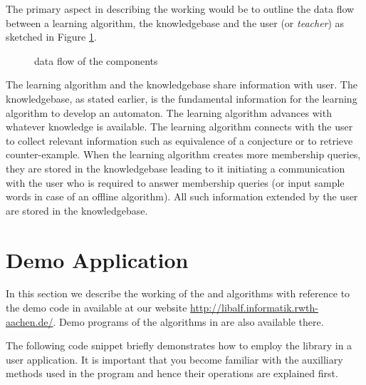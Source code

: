 The primary aspect in describing the working would be to outline the data flow between a learning algorithm, the knowledgebase and the user (or \emph{teacher}) as sketched in Figure \ref{communications}.

\begin{figure}
\centering
{}
\caption{data flow of the \libalf components}
\label{communications}
\end{figure}

The learning algorithm and the knowledgebase share information with user. The knowledgebase, as stated earlier, is the fundamental information for the learning algorithm to develop an automaton. The learning algorithm advances with whatever knowledge is available. The learning algorithm connects with the user to collect relevant information such as equivalence of a conjecture or to retrieve counter-example. When the learning algorithm creates more membership queries, they are stored in the knowledgebase leading to it initiating a communication with the user who is required to answer membership queries (or input sample words in case of an offline algorithm). All such information extended by the user are stored in the knowledgebase. 

\section{Demo Application}

In this section we describe the working of the \offline and \online algorithms with reference to the demo code in \cpp available at our website \url{http://libalf.informatik.rwth-aachen.de/}. Demo programs of the algorithms in \java are also available there.

The following code snippet briefly demonstrates how to employ the \libalf library in a user application. It is important that you become familiar with the auxilliary methods used in the program and hence their operations are explained first.

